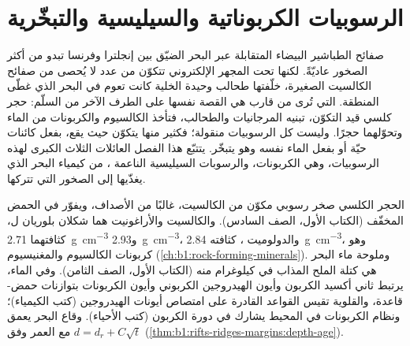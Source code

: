 \chapter{الرسوبيات الكربوناتية والسيليسية والتبخّرية}\label{ch:b1:chemical-biogenic-sediments}

صفائح الطباشير البيضاء المتقابلة عبر البحر الضيّق بين إنجلترا وفرنسا تبدو من أكثر الصخور عاديّةً. لكنها تحت المجهر الإلكتروني تتكوّن من عدد لا يُحصى من صفائح الكالسيت الصغيرة، خلّفتها طحالب وحيدة الخلية كانت تعوم في البحر الذي غطّى المنطقة.  التي تُرى من قارب هي القصة نفسها على الطرف الآخر من السلّم: حجر كلسي قيد التكوّن، تبنيه المرجانيات والطحالب، فتأخذ الكالسيوم والكربونات من الماء وتحوّلهما حجرًا. وليست كل الرسوبيات منقولة؛ فكثير منها يتكوّن حيث يقع، بفعل كائنات حيّة أو بفعل الماء نفسه وهو يتبخّر. يتتبّع هذا الفصل العائلات الثلاث الكبرى لهذه الرسوبيات، وهي الكربونات، والرسوبات السيليسية الناعمة ، من كيمياء البحر الذي يغذّيها إلى الصخور التي تتركها.

\begin{recall}
الحجر الكلسي صخر رسوبي مكوّن من الكالسيت، غالبًا من الأصداف، ويفوّر في الحمض المخفّف (الكتاب الأول، الصف السادس). والكالسيت والأراغونيت هما شكلان بلوريان ل، كثافتهما \qty{2.71}{g.cm^{-3}} و\qty{2.93}{g.cm^{-3}}، والدولوميت ، كثافته \qty{2.84}{g.cm^{-3}}، وهو كربونات الكالسيوم والمغنيسيوم (\cref{ch:b1:rock-forming-minerals}). وملوحة ماء البحر هي كتلة الملح المذاب في كيلوغرام منه (الكتاب الأول، الصف الثامن). وفي الماء، يرتبط ثاني أكسيد الكربون وأيون الهيدروجين الكربوني وأيون الكربونات بتوازنات حمض-قاعدة، والقلوية تقيس القواعد القادرة على امتصاص أيونات الهيدروجين (كتب الكيمياء)؛ ونظام الكربونات في المحيط يشارك في دورة الكربون (كتب الأحياء). وقاع البحر يعمق مع العمر وفق $d = d_r + C\sqrt t$ (\cref{thm:b1:rifts-ridges-margins:depth-age}).
\end{recall}

